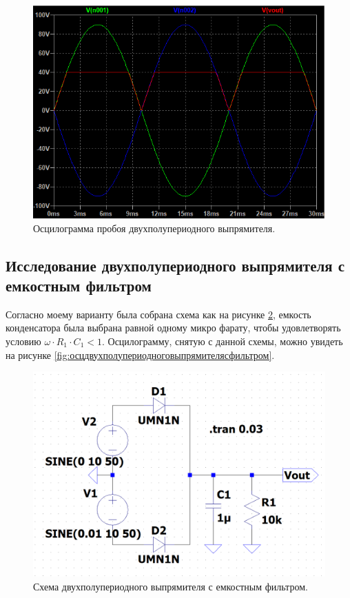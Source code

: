 \begin{figure}[htbp]
    \centering
    \includegraphics[width=0.8\linewidth]{figs/пробой_двухполупериодного_выпрямителя.png}
    \caption{Осцилограмма пробоя двухполупериодного выпрямителя.}
    \label{fig:пробойдвухполупериодноговыпрямителя}
\end{figure}



\subsection*{Исследование двухполупериодного выпрямителя с емкостным фильтром}

Согласно моему варианту была собрана схема как на рисунке \ref{fig:схемадвухполупериодноговыпрямителясфильтром},
емкость конденсатора была выбрана равной одному микро фарату, чтобы удовлетворять условию $\omega\cdot R_1\cdot C_1 < 1$.
Осцилограмму, снятую с данной схемы, можно увидеть на рисунке \ref{fig:осцдвухполупериодноговыпрямителясфильтром}.

\begin{figure}[htbp]
    \centering
    \includegraphics[width=0.8\linewidth]{figs/схема_двухполупериодного_выпрямителя_с_фильтром.png}
    \caption{Схема двухполупериодного выпрямителя с емкостным фильтром.}
    \label{fig:схемадвухполупериодноговыпрямителясфильтром}
\end{figure}

